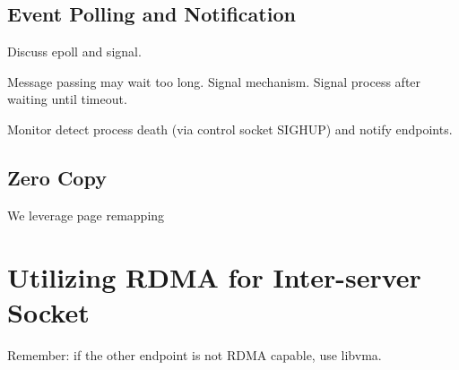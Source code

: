 \subsection{Event Polling and Notification}
\label{subsec:epoll}

Discuss epoll and signal.

Message passing may wait too long.
Signal mechanism. Signal process after waiting until timeout.

Monitor detect process death (via control socket SIGHUP) and notify endpoints.


\subsection{Zero Copy}
\label{subsec:zerocopy}

We leverage page remapping


\section{Utilizing RDMA for Inter-server Socket}
\label{sec:rdma}

Remember: if the other endpoint is not RDMA capable, use libvma.
